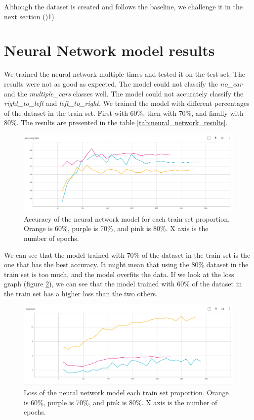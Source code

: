 Although the dataset is created and follows the baseline, we challenge it in the next section ()\ref{sec:neural_network_results}).

\section{Neural Network model results}
\label{sec:neural_network_results}

We trained the neural network multiple times and tested it on the test set. The results were not as good as expected. The model could not classify the \textit{no\_car} and the \textit{multiple\_cars} classes well. The model could not accurately classify the \textit{right\_to\_left} and \textit{left\_to\_right}. We trained the model with different percentages of the dataset in the train set. First with 60\%, then with 70\%, and finally with 80\%.
The results are presented in the table \ref{tab:neural_network_results}.

\begin{figure}[H]
    \centering
    \includegraphics[width=1\textwidth]{images/accuracy_test.png}
    \caption{Accuracy of the neural network model for each train set proportion. Orange is 60\%, purple is 70\%, and pink is 80\%. X axis is the number of epochs.}
    \label{ftab:neural_network_results}
\end{figure}

We can see that the model trained with 70\% of the dataset in the train set is the one that has the best accuracy. It might mean that using the 80\% dataset in the train set is too much, and the model overfits the data. If we look at the loss graph (figure \ref{fig:loss_test}), we can see that the model trained with 60\% of the dataset in the train set has a higher loss than the two others. 

\begin{figure}[H]
    \centering
    \includegraphics[width=1\textwidth]{images/loss_test.png}
    \caption{Loss of the neural network model each train set proportion. Orange is 60\%, purple is 70\%, and pink is 80\%. X axis is the number of epochs.}
    \label{fig:loss_test}
\end{figure}

